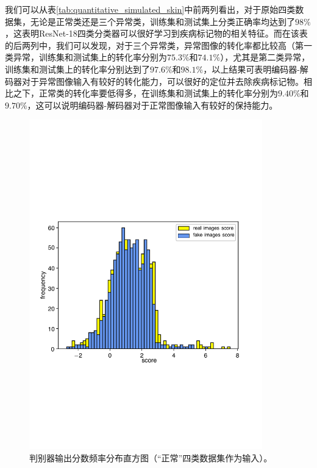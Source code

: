 我们可以从表\ref{tab:quantitative_simulated_skin}中前两列看出，对于原始四类数据集，无论是正常类还是三个异常类，训练集和测试集上分类正确率均达到了$98\%$，这表明ResNet-18四类分类器可以很好学习到疾病标记物的相关特征。而在该表的后两列中，我们可以发现，对于三个异常类，异常图像的转化率都比较高（第一类异常，训练集和测试集上的转化率分别为$75.3\%$和$74.1\%$），尤其是第二类异常，训练集和测试集上的转化率分别达到了$97.6\%$和$98.1\%$，以上结果可表明编码器-解码器对于异常图像输入有较好的转化能力，可以很好的定位并去除疾病标记物。相比之下，正常类的转化率要低得多，在训练集和测试集上的转化率分别为$9.40\%$和$9.70\%$，这可以说明编码器-解码器对于正常图像输入有较好的保持能力。
\begin{figure}[h]
	\centering
	\includegraphics[width=0.9\textwidth]{figure/simulated_skin_score_distribution.pdf}
	\caption[判别器输出分数频率分布直方图（“正常”四类数据集作为输入）]{判别器输出分数频率分布直方图（“正常”四类数据集作为输入）。}
	\label{fig:simulated_skin_hist_freq}
\end{figure}

